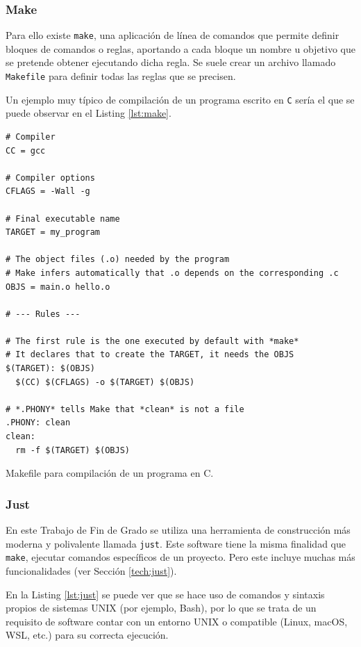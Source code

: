 \subsubsection*{Make}
\label{subsec:make}

Para ello existe \texttt{make}\cite{make}, una aplicación de línea de comandos que permite definir bloques de comandos o reglas, aportando a cada bloque un nombre u objetivo que se pretende obtener ejecutando dicha regla. Se suele crear un archivo llamado \texttt{Makefile} para definir todas las reglas que se precisen.

Un ejemplo muy típico de compilación de un programa escrito en \texttt{C} sería el que se puede observar en el Listing \ref{lst:make}.

\begin{listing}[!ht]
  \begin{verbatim}
# Compiler
CC = gcc

# Compiler options
CFLAGS = -Wall -g

# Final executable name
TARGET = my_program

# The object files (.o) needed by the program
# Make infers automatically that .o depends on the corresponding .c
OBJS = main.o hello.o

# --- Rules ---

# The first rule is the one executed by default with *make*
# It declares that to create the TARGET, it needs the OBJS
$(TARGET): $(OBJS)
  $(CC) $(CFLAGS) -o $(TARGET) $(OBJS)

# *.PHONY* tells Make that *clean* is not a file
.PHONY: clean
clean:
  rm -f $(TARGET) $(OBJS)
\end{verbatim}
\caption{Makefile para compilación de un programa en C.}
\label{lst:make}
\end{listing}

\subsubsection*{Just}
\label{subsec:just}

En este Trabajo de Fin de Grado se utiliza una herramienta de construcción más moderna y polivalente llamada \texttt{just}\cite{just}. Este software tiene la misma finalidad que \texttt{make}, ejecutar comandos específicos de un proyecto. Pero este incluye muchas más funcionalidades (ver Sección \ref{tech:just}).

En la Listing \ref{lst:just} se puede ver que se hace uso de comandos y sintaxis propios de sistemas UNIX (por ejemplo, Bash), por lo que se trata de un requisito de software contar con un entorno UNIX o compatible (Linux, macOS, WSL, etc.) para su correcta ejecución.

